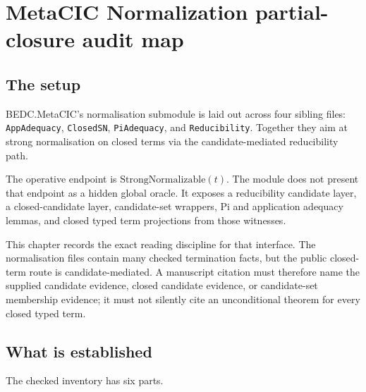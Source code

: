 \chapter{MetaCIC Normalization partial-closure audit map}
\label{ch:metacic-normalization-audit-map}

\section{The setup}
\label{sec:metacic-normalization-audit-map-setup}

BEDC.MetaCIC's normalisation submodule is laid out across four sibling files:
\texttt{AppAdequacy}, \texttt{ClosedSN}, \texttt{PiAdequacy}, and
\texttt{Reducibility}. Together they aim at strong normalisation on closed terms
via the candidate-mediated reducibility path.

The operative endpoint is $\mathrm{StrongNormalizable}(t)$. The module does not
present that endpoint as a hidden global oracle. It exposes a reducibility
candidate layer, a closed-candidate layer, candidate-set wrappers, Pi and
application adequacy lemmas, and closed typed term projections from those
witnesses.

This chapter records the exact reading discipline for that interface. The
normalisation files contain many checked termination facts, but the public
closed-term route is candidate-mediated. A manuscript citation must therefore
name the supplied candidate evidence, closed candidate evidence, or candidate-set
membership evidence; it must not silently cite an unconditional theorem for every
closed typed term.

\section{What is established}
\label{sec:metacic-normalization-audit-map-established}

The checked inventory has six parts.

